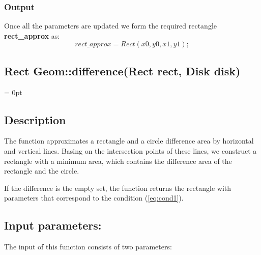 \documentclass{report}
\begin{document}
\subsubsection*{Output}

Once all the parameters are updated we form the required rectangle {\bfseries rect\_approx} as:
\begin{equation}
	rect\_approx = Rect(x0, y0, x1, y1);
	\label{rect}
\end{equation}


\newpage

\label{Difference}
\begin{center} 
	\section*{Rect Geom::difference(Rect rect, Disk disk)}
\end{center}
\parindent = 0pt
\subsection*{Description}

The function approximates a rectangle and a circle difference area by horizontal and vertical lines. Basing on the intersection points of these lines, we construct a rectangle with a minimum area, which contains the difference area of the rectangle and the circle.

If the difference is the empty set, the function returns the rectangle with parameters that correspond to the condition (\ref{eq:cond1}).

\subsection*{Input parameters:}

The input of this function consists of two parameters:
\end{document}
